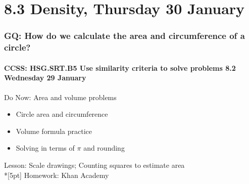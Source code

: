 \documentclass{beamer}
\begin{document}
\section{8.3 Density, Thursday 30 January}
\frame
{
  \frametitle{GQ: How do we calculate the area and circumference of a circle?}
  \framesubtitle{CCSS: HSG.SRT.B5 Use similarity criteria to solve problems \hfill \alert{8.2 Wednesday 29 January}}

  \begin{block}{Do Now: Area and volume problems}
  \begin{itemize}
    \item Circle area and circumference
    \item Volume formula practice
    \item Solving in terms of $\pi$ and rounding
  \end{itemize}
  \end{block}
  Lesson: Scale drawings; Counting squares to estimate area\\*[5pt]
  Homework: Khan Academy
}
\end{document}
